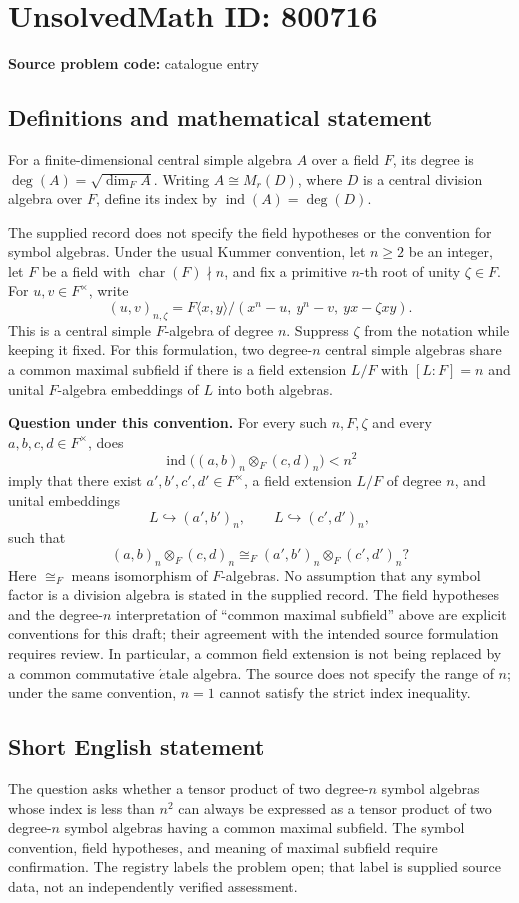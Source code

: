 \documentclass[11pt]{article}
\begin{document}
\section*{UnsolvedMath ID: 800716}
\textbf{Source problem code:} catalogue entry
\subsection{Definitions and mathematical statement}
For a finite-dimensional central simple algebra \(A\) over a field \(F\), its degree is \(\deg(A)=\sqrt{\dim_F A}\). Writing \(A\cong M_r(D)\), where \(D\) is a central division algebra over \(F\), define its index by \(\operatorname{ind}(A)=\deg(D)\).

The supplied record does not specify the field hypotheses or the convention for symbol algebras. Under the usual Kummer convention, let \(n\geq 2\) be an integer, let \(F\) be a field with \(\operatorname{char}(F)\nmid n\), and fix a primitive \(n\)-th root of unity \(\zeta\in F\). For \(u,v\in F^\times\), write
\[
(u,v)_{n,\zeta}=F\langle x,y\rangle/(x^n-u,\ y^n-v,\ yx-\zeta xy).
\]
This is a central simple \(F\)-algebra of degree \(n\). Suppress \(\zeta\) from the notation while keeping it fixed. For this formulation, two degree-\(n\) central simple algebras share a common maximal subfield if there is a field extension \(L/F\) with \([L:F]=n\) and unital \(F\)-algebra embeddings of \(L\) into both algebras.

\textbf{Question under this convention.} For every such \(n,F,\zeta\) and every \(a,b,c,d\in F^\times\), does
\[
\operatorname{ind}\bigl((a,b)_n\otimes_F(c,d)_n\bigr)<n^2
\]
imply that there exist \(a',b',c',d'\in F^\times\), a field extension \(L/F\) of degree \(n\), and unital embeddings
\[
L\hookrightarrow(a',b')_n,
\qquad
L\hookrightarrow(c',d')_n,
\]
such that
\[
(a,b)_n\otimes_F(c,d)_n
\cong_F
(a',b')_n\otimes_F(c',d')_n?
\]
Here \(\cong_F\) means isomorphism of \(F\)-algebras. No assumption that any symbol factor is a division algebra is stated in the supplied record. The field hypotheses and the degree-\(n\) interpretation of ``common maximal subfield'' above are explicit conventions for this draft; their agreement with the intended source formulation requires review. In particular, a common field extension is not being replaced by a common commutative \(\acute{e}\)tale algebra. The source does not specify the range of \(n\); under the same convention, \(n=1\) cannot satisfy the strict index inequality.
\subsection{Short English statement}
The question asks whether a tensor product of two degree-\(n\) symbol algebras whose index is less than \(n^2\) can always be expressed as a tensor product of two degree-\(n\) symbol algebras having a common maximal subfield. The symbol convention, field hypotheses, and meaning of maximal subfield require confirmation. The registry labels the problem open; that label is supplied source data, not an independently verified assessment.
\end{document}
